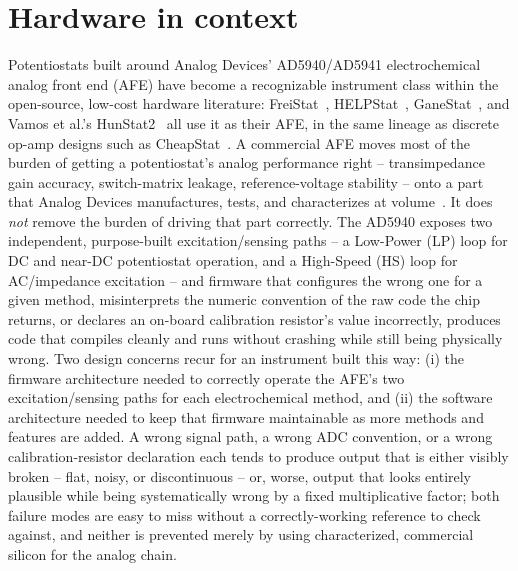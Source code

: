 \section{Hardware in context}
\label{sec:hw-context}

Potentiostats built around Analog Devices' AD5940/AD5941 electrochemical
analog front end (AFE) have become a recognizable instrument class within
the open-source, low-cost hardware literature: FreiStat~\cite{bill2023electrochemical},
HELPStat~\cite{bautista2025helpstat}, GaneStat~\cite{anshori2025ganestat},
and Vamos et al.'s HunStat2~\cite{vamos2025hunstat2} all use it as their
AFE, in the same lineage as discrete op-amp designs such as
CheapStat~\cite{rowe2011cheapstat}. A commercial AFE moves most of the
burden of getting a potentiostat's analog performance right -- transimpedance
gain accuracy, switch-matrix leakage, reference-voltage stability -- onto a
part that Analog Devices manufactures, tests, and characterizes at
volume~\cite{devices2024ad5940}. It does \emph{not} remove the burden of
driving that part correctly. The AD5940 exposes two independent,
purpose-built excitation/sensing paths -- a Low-Power (LP) loop for DC and
near-DC potentiostat operation, and a High-Speed (HS) loop for AC/impedance
excitation -- and firmware that configures the wrong one for a given
method, misinterprets the numeric convention of the raw code the chip
returns, or declares an on-board calibration resistor's value incorrectly,
produces code that compiles cleanly and runs without crashing while still
being physically wrong. Two design concerns recur for an instrument built
this way: (i) the firmware architecture needed to correctly operate the
AFE's two excitation/sensing paths for each electrochemical method, and (ii)
the software architecture needed to keep that firmware maintainable as more
methods and features are added. A wrong signal path, a wrong ADC
convention, or a wrong calibration-resistor declaration each tends to
produce output that is either visibly broken -- flat, noisy, or
discontinuous -- or, worse, output that looks entirely plausible while
being systematically wrong by a fixed multiplicative factor; both failure
modes are easy to miss without a correctly-working reference to check
against, and neither is prevented merely by using characterized,
commercial silicon for the analog chain.

